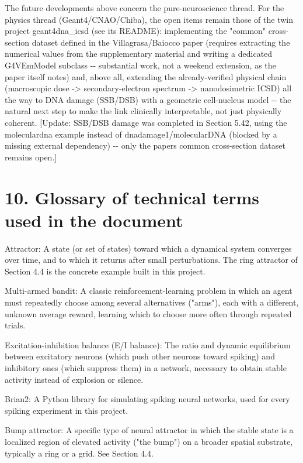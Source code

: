 \documentclass[
  english,
]{article}
\begin{document}
The future developments above concern the pure-neuroscience thread. For the physics thread (Geant4/CNAO/Chiba), the open items remain those of the twin project geant4dna\_\allowbreak{}icsd (see its README): implementing the "common" cross-section dataset defined in the Villagrasa/Baiocco paper (requires extracting the numerical values from the supplementary material and writing a dedicated G4VEmModel subclass -\/- substantial work, not a weekend extension, as the paper itself notes) and, above all, extending the already-verified physical chain (macroscopic dose -\textgreater{} secondary-electron spectrum -\textgreater{} nanodosimetric ICSD) all the way to DNA damage (SSB/DSB) with a geometric cell-nucleus model -\/- the natural next step to make the link clinically interpretable, not just physically coherent. {[}Update: SSB/DSB damage was completed in Section 5.42, using the moleculardna example instead of dnadamage1/molecularDNA (blocked by a missing external dependency) -\/- only the paper\textquotesingle s common cross-section dataset remains open.{]}

\section{10. Glossary of technical terms used in the document}\label{glossary-of-technical-terms-used-in-the-document}

Attractor: A state (or set of states) toward which a dynamical system converges over time, and to which it returns after small perturbations. The ring attractor of Section 4.4 is the concrete example built in this project.

Multi-armed bandit: A classic reinforcement-learning problem in which an agent must repeatedly choose among several alternatives ("arms"), each with a different, unknown average reward, learning which to choose more often through repeated trials.

Excitation-inhibition balance (E/I balance): The ratio and dynamic equilibrium between excitatory neurons (which push other neurons toward spiking) and inhibitory ones (which suppress them) in a network, necessary to obtain stable activity instead of explosion or silence.

Brian2: A Python library for simulating spiking neural networks, used for every spiking experiment in this project.

Bump attractor: A specific type of neural attractor in which the stable state is a localized region of elevated activity ("the bump") on a broader spatial substrate, typically a ring or a grid. See Section 4.4.
\end{document}
